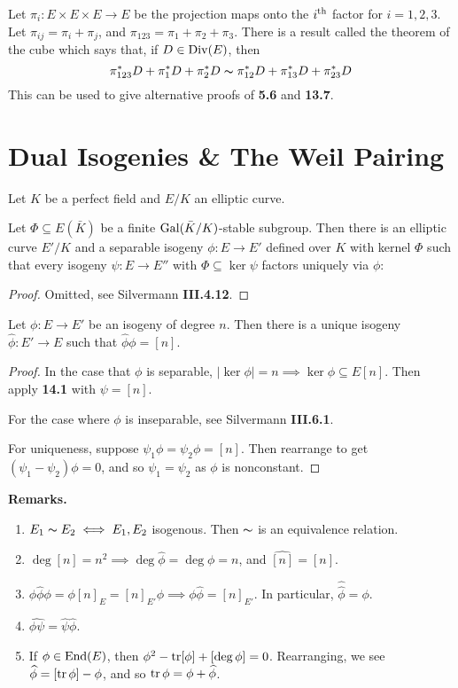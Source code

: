 \documentclass[10pt,a4paper]{article}
\begin{document}
Let $\pi_i :E\times E \times E \to E$ be the projection maps onto the $i\textsuperscript{th}$ factor for $i=1,2,3$. Let $\pi_{ij} = \pi_i + \pi_j$, and $\pi_{123} = \pi_1+\pi_2+\pi_3$. There is a result called the theorem of the cube which says that, if $D \in \operatorname{Div}(E)$, then
\[\pi_{123}^\ast D + \pi_1^\ast D + \pi_2^\ast D \thicksim \pi_{12}^\ast D + \pi_{13}^\ast D + \pi_{23}^\ast D\]
This can be used to give alternative proofs of \textbf{5.6} and \textbf{13.7}.

\section{Dual Isogenies \& The Weil Pairing}
Let $K$ be a perfect field and $E/K$ an elliptic curve.
\begin{proposition}
  Let $\Phi \subseteq E(\bar{K})$ be a finite $\operatorname{Gal}(\bar{K}/K)$-stable subgroup. Then there is an elliptic curve $E'/K$ and a separable isogeny $\phi:E \to E'$ defined over $K$ with kernel $\Phi$ such that every isogeny $\psi:E \to E''$ with $\Phi \subseteq \ker \psi$ factors uniquely via $\phi$:
  \begin{center}
  \end{center}
\end{proposition}
\begin{proof}
  Omitted, see Silvermann \textbf{III.4.12}.
\end{proof}
\begin{proposition}
  Let $\phi:E \to E'$ be an isogeny of degree $n$. Then there is a unique isogeny $\hat{\phi}:E'\to E$ such that $\hat{\phi}\phi = [n]$.
\end{proposition}
\begin{proof}
  In the case that $\phi$ is separable, $|\ker \phi| = n \implies \ker \phi \subseteq E[n]$. Then apply \textbf{14.1} with $\psi = [n]$.

  For the case where $\phi$ is inseparable, see Silvermann \textbf{III.6.1}.

  For uniqueness, suppose $\psi_1\phi = \psi_2\phi = [n]$. Then rearrange to get $(\psi_1-\psi_2)\phi = 0$, and so $\psi_1=\psi_2$ as $\phi$ is nonconstant.
\end{proof}
\textbf{Remarks.}
\begin{enumerate}
  \item $E_1 \thicksim E_2 \iff E_1, E_2$ isogenous. Then $\thicksim$ is an equivalence relation.
  \item $\deg [n] = n^2 \implies \deg \hat{\phi} = \deg \phi = n$, and $\hat{[n]} = [n]$.
  \item $\phi\hat{\phi}\phi = \phi[n]_E = [n]_{E'}\phi \implies \phi\hat{\phi} = [n]_{E'}$. In particular, $\hat{\hat{\phi}} = \phi$.
  \item $\hat{\phi\psi} = \hat{\psi}\hat{\phi}$.
  \item If $\phi\in \operatorname{End}(E)$, then $\phi^2-\operatorname{tr}[\phi]+[\deg\phi] = 0$. Rearranging, we see $\widehat{\phi} = [\operatorname{tr}\phi] - \phi$, and so $\operatorname{tr}\phi = \phi+\widehat{\phi}$.
\end{enumerate}
\end{document}

